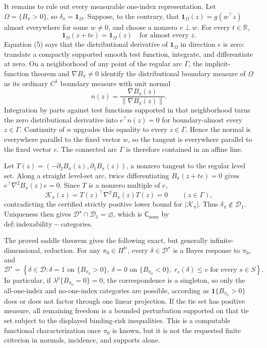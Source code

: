 It remains to rule out every measurable one-index representation. Let \(\Omega=\{B_{\pi}>0\}\), so \(\delta_{\pi}=\mathbf1_{\Omega}\). Suppose, to the contrary, that \(\mathbf1_{\Omega}(z)=g(w^{\top}z)\) almost everywhere for some \(w\neq0\), and choose a nonzero \(e\perp w\). For every \(t\in\mathbb R\),
\[
 \mathbf1_{\Omega}(z+te)=\mathbf1_{\Omega}(z)\quad\text{for almost every }z. \tag{5}
\]
Equation (5) says that the distributional derivative of \(\mathbf1_{\Omega}\) in direction \(e\) is zero: translate a compactly supported smooth test function, integrate, and differentiate at zero. On a neighborhood of any point of the regular arc \(\Gamma\), the implicit-function theorem and \(\nabla B_{\pi}\neq0\) identify the distributional boundary measure of \(\Omega\) as its ordinary \(C^1\) boundary measure with unit normal
\[
 n(z)=\frac{\nabla B_{\pi}(z)}{\|\nabla B_{\pi}(z)\|}.
\]
Integration by parts against test functions supported in that neighborhood turns the zero distributional derivative into \(e^{\top}n(z)=0\) for boundary-almost every \(z\in\Gamma\). Continuity of \(n\) upgrades this equality to every \(z\in\Gamma\). Hence the normal is everywhere parallel to the fixed vector \(w\), so the tangent is everywhere parallel to the fixed vector \(e\). The connected arc \(\Gamma\) is therefore contained in an affine line.

Let \(T(z)=(-\partial_2B_{\pi}(z),\partial_1B_{\pi}(z))\), a nonzero tangent to the regular level set. Along a straight level-set arc, twice differentiating \(B_{\pi}(z+te)=0\) gives \(e^{\top}\nabla^2B_{\pi}(z)e=0\). Since \(T\) is a nonzero multiple of \(e\),
\[
 \mathcal K_{\pi}(z)=T(z)^{\top}\nabla^2B_{\pi}(z)T(z)=0
 \qquad(z\in\Gamma),
\]
contradicting the certified strictly positive lower bound for \(|\mathcal K_{\pi}|\). Thus \(\delta_{\pi}\notin\mathcal D_1\). Uniqueness then gives \(\mathcal D^{\star}\cap\mathcal D_1=\varnothing\), which is \(\mathsf C_{\mathrm{none}}\) by \(\mathrm{def:indexability-categories}\).

The proved saddle theorem gives the following exact, but generally infinite-dimensional, reduction. For any \(\pi_0\in\Pi^{\mathrm{fc}}\), every \(\delta\in\mathcal D^{\star}\) is a Bayes response to \(\pi_0\), and
\[
 \mathcal D^{\star}
 =\left\{\delta\in\mathcal D:
 \delta=1\text{ on }\{B_{\pi_0}>0\},\
 \delta=0\text{ on }\{B_{\pi_0}<0\},\
 r_s(\delta)\leq v\text{ for every }s\in S
 \right\}.
\]
In particular, if \(\lambda^p\{B_{\pi_0}=0\}=0\), the correspondence is a singleton, so only the all-one-index and no-one-index categories are possible, according as \(\mathbf1\{B_{\pi_0}>0\}\) does or does not factor through one linear projection. If the tie set has positive measure, all remaining freedom is a bounded perturbation supported on that tie set subject to the displayed binding-risk inequalities. This is a computable functional characterization once \(\pi_0\) is known, but it is not the requested finite criterion in normals, incidence, and supports alone.

